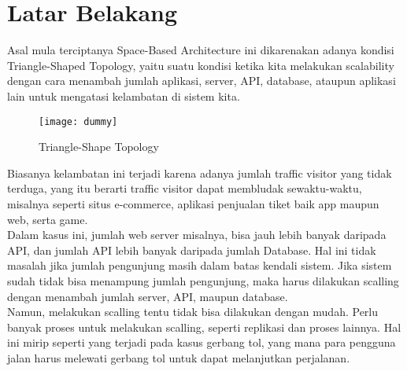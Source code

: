 %
	\section*{\huge{Latar Belakang}}
	\large Asal mula terciptanya Space-Based Architecture ini dikarenakan adanya kondisi Triangle-Shaped Topology, yaitu suatu kondisi ketika kita melakukan scalability dengan cara menambah jumlah aplikasi, server, API, database, ataupun aplikasi lain untuk mengatasi kelambatan di sistem kita.\\
	\vskip0.15cm
	\begin{figure}
		\centering
		\texttt{[image: dummy]}
		\caption{Triangle-Shape Topology}
	\end{figure}
	\vskip0.15cm
	Biasanya kelambatan ini terjadi karena adanya jumlah traffic visitor yang tidak terduga, yang itu berarti traffic visitor dapat membludak sewaktu-waktu, misalnya seperti situs e-commerce, aplikasi penjualan tiket baik app maupun web, serta game.\\
	
	Dalam kasus ini, jumlah web server misalnya, bisa jauh lebih banyak daripada API, dan jumlah API lebih banyak daripada jumlah Database. Hal ini tidak masalah jika jumlah pengunjung masih dalam batas kendali sistem. Jika sistem sudah tidak bisa menampung jumlah pengunjung, maka harus dilakukan scalling dengan menambah jumlah server, API, maupun database.\\
	
	Namun, melakukan scalling tentu tidak bisa dilakukan dengan mudah. Perlu banyak proses untuk melakukan scalling, seperti replikasi dan proses lainnya. Hal ini mirip seperti yang terjadi pada kasus gerbang tol, yang mana para pengguna jalan harus melewati gerbang tol untuk dapat melanjutkan perjalanan.\\
	
